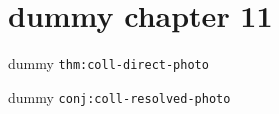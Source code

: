 \clearpage\begingroup\small
\setcounter{chapter}{11}\addtocounter{chapter}{-1}
\chapter{dummy chapter 11}
\begin{theorem}\label{thm:coll-direct-photo}dummy \texttt{thm:coll-direct-photo}\end{theorem}
\begin{conjecture}\label{conj:coll-resolved-photo}dummy \texttt{conj:coll-resolved-photo}\end{conjecture}
\endgroup

